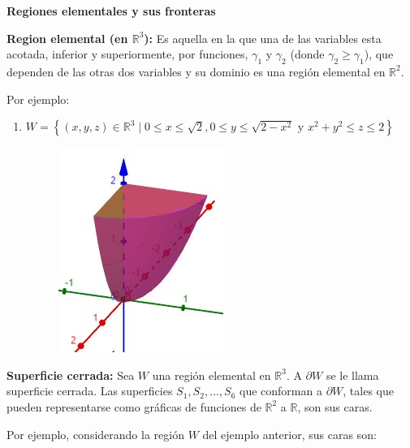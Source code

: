 \documentclass[fleqn]{article}
\begin{document}
    \begin{center}
        {\Huge \textbf{Regiones elementales y sus fronteras}} 
    \end{center}
    \vspace{7mm}

    \textbf{Region elemental (en $ \mathbb{R}^3 $):} Es aquella en la que una de las variables esta acotada, inferior y superiormente, por funciones, $ \gamma_1 $ y $ \gamma_2 $ (donde $ \gamma_2 \geq \gamma_1 $), que dependen de las otras dos variables y su dominio es una región elemental en $ \mathbb{R}^2 $. 

    Por ejemplo:

    \begin{enumerate}

        \item $ W = \left\lbrace (x,y,z) \in \mathbb{R}^3 \; \big| \; 0 \leq x \leq \sqrt{2}, 0 \leq y \leq \sqrt{2 - x^2} \text{ y } x^2 + y^2 \leq z \leq 2 \right\rbrace $
        
        \begin{figure}[htb]
            \centering
            \includegraphics{Captura_1.jpg}
        \end{figure}

    \end{enumerate}

    \textbf{Superficie cerrada:} Sea $ W $ una región elemental en $ \mathbb{R}^3 $. A $ \partial W $ se le llama superficie cerrada. Las superficies $ S_1, S_2, \dots , S_6 $ que conforman a $ \partial W $, tales que pueden representarse como gráficas de funciones de $ \mathbb{R}^2 $ a $ \mathbb{R} $, son sus caras.

    Por ejemplo, considerando la región $ W $ del ejemplo anterior, sus caras son:
\end{document}
